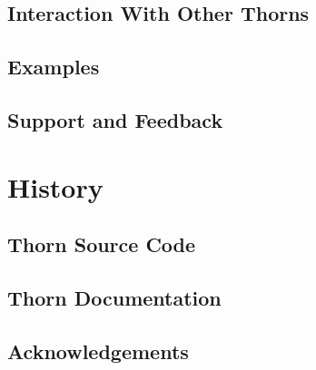 \subsection{Interaction With Other Thorns}

\subsection{Examples}

\subsection{Support and Feedback}

\section{History}

\subsection{Thorn Source Code}

\subsection{Thorn Documentation}

\subsection{Acknowledgements}


\begin{thebibliography}{9}

\end{thebibliography}



